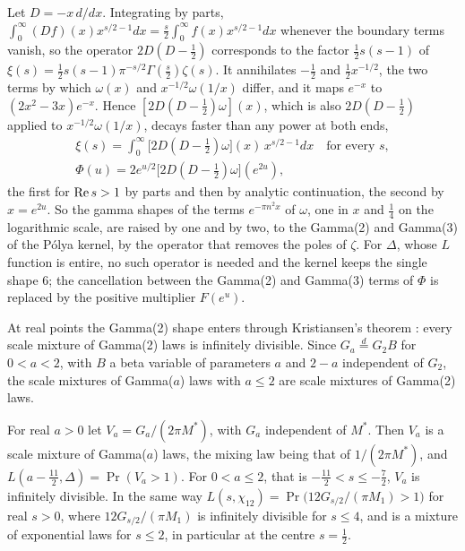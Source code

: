 \begin{remark}\label{rem:maxexp:shapes}
Let $D=-x\,d/dx$. Integrating by parts, $\int_0^\infty(Df)(x)x^{s/2-1}dx=\frac s2\int_0^\infty f(x)x^{s/2-1}dx$ whenever the boundary terms vanish, so the operator $2D(D-\frac12)$ corresponds to the factor $\frac12s(s-1)$ of $\xi(s)=\frac12s(s-1)\pi^{-s/2}\Gamma(\frac s2)\zeta(s)$. It annihilates $-\frac12$ and $\frac12x^{-1/2}$, the two terms by which $\omega(x)$ and $x^{-1/2}\omega(1/x)$ differ, and it maps $e^{-x}$ to $(2x^2-3x)e^{-x}$. Hence $[2D(D-\frac12)\omega](x)$, which is also $2D(D-\frac12)$ applied to $x^{-1/2}\omega(1/x)$, decays faster than any power at both ends,
\begin{gather*}
\xi(s)=\int_0^\infty\big[2D(D-\tfrac12)\omega\big](x)\,x^{s/2-1}dx\quad\text{for every }s,\\
\Phi(u)=2e^{u/2}\big[2D(D-\tfrac12)\omega\big](e^{2u}),
\end{gather*}
the first for $\operatorname{Re} s>1$ by parts and then by analytic continuation, the second by $x=e^{2u}$. So the gamma shapes of the terms $e^{-\pi n^2x}$ of $\omega$, one in $x$ and $\frac14$ on the logarithmic scale, are raised by one and by two, to the Gamma(2) and Gamma(3) of the P\'olya kernel, by the operator that removes the poles of $\zeta$. For $\Delta$, whose $L$ function is entire, no such operator is needed and the kernel keeps the single shape $6$; the cancellation between the Gamma(2) and Gamma(3) terms of $\Phi$ is replaced by the positive multiplier $F(e^u)$.
\end{remark}

At real points the Gamma(2) shape enters through Kristiansen's theorem \cite{Kristiansen94}: every scale mixture of Gamma(2) laws is infinitely divisible. Since $G_a\overset d=G_2B$ for $0<a<2$, with $B$ a beta variable of parameters $a$ and $2-a$ independent of $G_2$, the scale mixtures of Gamma($a$) laws with $a\le2$ are scale mixtures of Gamma(2) laws.

\begin{proposition}\label{prop:maxexp:krist}
For real $a>0$ let $V_a=G_a/(2\pi M^*)$, with $G_a$ independent of $M^*$. Then $V_a$ is a scale mixture of Gamma($a$) laws, the mixing law being that of $1/(2\pi M^*)$, and $L(a-\frac{11}2,\Delta)=\Pr(V_a>1)$. For $0<a\le2$, that is $-\frac{11}2<s\le-\frac72$, $V_a$ is infinitely divisible. In the same way $L(s,\chi_{12})=\Pr\big(12G_{s/2}/(\pi M_1)>1\big)$ for real $s>0$, where $12G_{s/2}/(\pi M_1)$ is infinitely divisible for $s\le4$, and is a mixture of exponential laws for $s\le2$, in particular at the centre $s=\frac12$.
\end{proposition}

